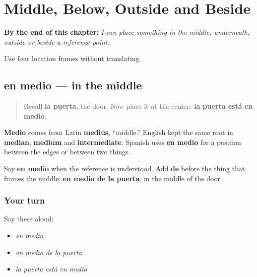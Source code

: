 
\chapter{Middle, Below, Outside and Beside}
\label{ch:medio-debajo-fuera-lado}

\begin{chapteropening}
\textbf{By the end of this chapter:} \emph{I can place something in the middle, underneath, outside or beside a reference point.}

Use four location frames without translating.
\end{chapteropening}

\section[en medio]{en medio — in the middle}

\label{lesson:ES-C407-medio}



\begin{quote}
Recall \textbf{la puerta}, the door. Now place it at the centre: \textbf{la puerta está en medio}.
\end{quote}

\begin{cousinweb}
\textbf{Medio} comes from Latin \textbf{medius}, “middle.” English kept the same root in \textbf{median}, \textbf{medium} and \textbf{intermediate}. Spanish uses \textbf{en medio} for a position between the edges or between two things.
\end{cousinweb}

\begin{grammarlens}[title={Grammar Lens: the frame en medio de}]
Say \textbf{en medio} when the reference is understood. Add \textbf{de} before the thing that frames the middle: \textbf{en medio de la puerta}, in the middle of the door.
\end{grammarlens}

\subsection*{Your turn}
Say these aloud:

\begin{itemize}
\raggedright
  \item \emph{en medio}
  \item \emph{en medio de la puerta}
  \item \emph{la puerta está en medio}
\end{itemize}

